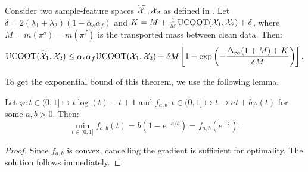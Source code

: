 \begin{theorem}
  \label{thm:ucoot_robust_copy}
  Consider two sample-feature spaces $\widetilde{\mathcal X_1}, \mathcal X_2$ as defined in
  . Let
  $\delta = 2(\lambda_1 + \lambda_2)(1 - \alpha_s\alpha_f)$ and
  $K = M + \frac{1}{M}\text{UCOOT}(\mathcal X_1, \mathcal X_2) +\delta$, where
  $M= m(\pi^s) = m(\pi^f)$ is the transported mass between clean data. Then:
     \begin{equation} %
      \begin{split}
        \ucoot(\widetilde{\cX_1}, \cX_2)
        \leq \alpha_s \alpha_f \ucoot(\cX_1, \cX_2) +
        \delta M \left[ 1 - \exp \left( {- \frac{\Delta_{\infty}(1+M) + K}{\delta M}} \right) \right].
      \end{split}\vspace{-10mm}
    \end{equation}
  \end{theorem}
  To get the exponential bound of this theorem, we use the following lemma.
  \begin{lemma}
  \label{slem:bound}
  Let $\varphi: t \in (0, 1] \mapsto t\log(t) - t + 1$ and
  $f_{a, b}: t \in (0, 1] \mapsto t \to at + b \varphi(t)$ for some $a, b > 0$.
  Then:
  \begin{equation}
      \min_{t \in (0, 1]} f_{a, b}(t) = b(1 - e^{-a/b}) = f_{a, b}(e^{-\frac{a}{b}}).
  \end{equation}
  \end{lemma}
  \begin{proof}
    Since $f_{a,b}$ is convex, cancelling the gradient is sufficient for optimality.
    The solution follows immediately.
  \end{proof}
